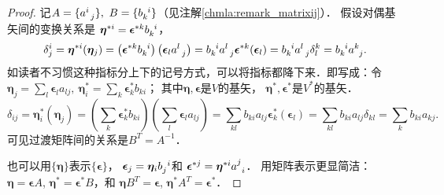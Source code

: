 \begin{proof}
    记$A=\{a^{i}_{\hphantom{a} j}\},\ B=\{b^{\hphantom{a} i} _k\}$（见注解\ref{chmla:remark_matrixij}）．
    假设对偶基矢间的变换关系是
    $\boldsymbol{\eta}^{*i} = \boldsymbol{\epsilon}^{*k} b^{\hphantom{a} i} _k $，
    \begin{equation}\label{chmla:eqn_inv-cov-base}
        \delta^i _j = \boldsymbol{\eta}^{*i}(\boldsymbol{\eta}_j) =
        \left( \boldsymbol{\epsilon}^{*k} b^{\hphantom{a} i} _k \right)
        \left( \boldsymbol{\epsilon}_l a^{l}_{\hphantom{a} j}  \right) =
        b^{\hphantom{a} i} _k   a^{l}_{\hphantom{a} j}
        \boldsymbol{\epsilon}^{*k}(\boldsymbol{\epsilon}_l) =
        b^{\hphantom{a} i} _k   a^{l}_{\hphantom{a} j}  \delta^k_l =
        b^{\hphantom{a} i} _k   a^{k}_{\hphantom{a} j}.
    \end{equation}
    如读者不习惯这种指标分上下的记号方式，可以将指标都降下来．即写成：令
    $\boldsymbol{\eta}_j = \sum_{l}\boldsymbol{\epsilon}_l a_{lj},\
    \boldsymbol{\eta}^{*}_i =\sum_{k} \boldsymbol{\epsilon}^{*}_k b_{ki}$；
    其中$\boldsymbol{\eta},\boldsymbol{\epsilon}$是$V$的基矢，
    $\boldsymbol{\eta}^{*},\boldsymbol{\epsilon}^{*}$是$V^*$的基矢．
\setlength{\mathindent}{0em}
    \begin{equation*}
        \delta_{ij} = \boldsymbol{\eta}^{*}_i(\boldsymbol{\eta}_j) =
        \left( \sum_{k} \boldsymbol{\epsilon}^{*}_k b_{ki} \right)
        \left( \sum_{l} \boldsymbol{\epsilon}_l a_{lj} \right) =
        \sum_{kl} b_{ki}  a_{lj}
        \boldsymbol{\epsilon}^{*}_k(\boldsymbol{\epsilon}_l) =
        \sum_{kl} b_{ki}  a_{lj}  \delta_{kl} =
        \sum_{k} b_{ki}  a_{kj}.
    \end{equation*}\setlength{\mathindent}{2em}
    可见过渡矩阵间的关系是$B^T=A^{-1}$．

    也可以用$\{\boldsymbol{\eta}\}$表示$\{\boldsymbol{\epsilon}\}$，
    $\boldsymbol{\epsilon}_j=\boldsymbol{\eta}_i b_j ^{\hphantom{a} i}$和
    $\boldsymbol{\epsilon}^{*j}=\boldsymbol{\eta}^{*i} a_{\hphantom{a} i} ^{j}$．
    用矩阵表示更显简洁：$\boldsymbol{\eta}=\boldsymbol{\epsilon}A$,
    $\boldsymbol{\eta}^{*}=\boldsymbol{\epsilon}^{*}B$，和
    $\boldsymbol{\eta}B^T=\boldsymbol{\epsilon}$,
    $\boldsymbol{\eta}^{*}A^T=\boldsymbol{\epsilon}^{*}$．
\end{proof}

